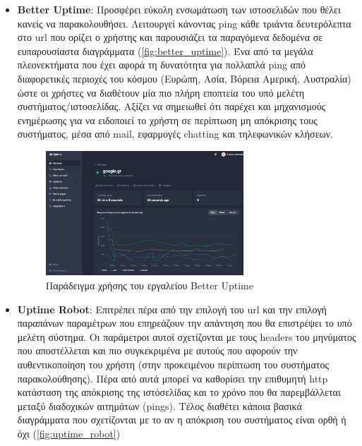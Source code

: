 \begin{itemize}
	\item \textbf{Better Uptime}: Προσφέρει εύκολη ενσωμάτωση των ιστοσελιδών που θέλει κανείς να παρακολουθήσει.
	      Λειτουργεί κάνοντας ping κάθε τριάντα δευτερόλεπτα στο url που ορίζει ο χρήστης και παρουσιάζει
	      τα παραγόμενα δεδομένα σε ευπαρουσίαστα διαγράμματα (\autoref{fig:better_uptime}). Ένα από τα μεγάλα πλεονεκτήματα που έχει αφορά
	      τη δυνατότητα για πολλαπλά ping από διαφορετικές περιοχές του κόσμου (Ευρώπη, Ασία, Βόρεια Αμερική, Αυστραλία)
	      ώστε οι χρήστες να διαθέτουν μία πιο πλήρη εποπτεία του υπό μελέτη συστήματος/ιστοσελίδας. Αξίζει να σημειωθεί
	      ότι παρέχει και μηχανισμούς ενημέρωσης για να ειδοποιεί το χρήστη σε περίπτωση μη απόκρισης τους συστήματος, μέσα
	      από mail, εφαρμογές chatting και τηλεφωνικών κλήσεων.
	      \begin{figure}[!ht]
		      \centering
		      \includegraphics[width=0.7\textwidth]{./images/chapter3/better-uptime.png}
		      \caption[Παράδειγμα χρήσης του εργαλείου Better Uptime]{Παράδειγμα χρήσης του εργαλείου Better Uptime}
		      \label{fig:better_uptime}
	      \end{figure}
	\item \textbf{Uptime Robot}: Επιτρέπει πέρα από την επιλογή του url και την επιλογή παραπάνων παραμέτρων που επηρεάζουν
	      την απάντηση που θα επιστρέψει το υπό μελέτη σύστημα. Οι παράμετροι αυτοί σχετίζονται με τους headers του μηνύματος που
	      αποστέλλεται και πιο συγκεκριμένα με αυτούς που αφορούν την αυθεντικοποίηση του χρήστη (στην προκειμένου περίπτωση
	      του συστήματος παρακολούθησης). Πέρα από αυτά μπορεί να καθορίσει την επιθυμητή http κατάσταση της απόκρισης
	      της ιστόσελίδας και το χρόνο που θα παρεμβάλλεται μεταξύ διαδοχικών αιτημάτων (pings). Τέλος διαθέτει κάποια βασικά διαγράμματα
	      που σχετίζονται με το αν η απόκριση του συστήματος είναι ορθή ή όχι (\autoref{fig:uptime_robot})
	      \begin{figure}[!ht]

\end{figure}
\end{itemize}
